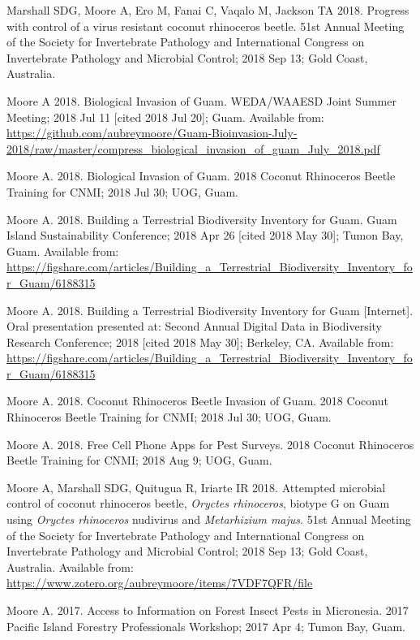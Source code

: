 \documentclass[12pt,english]{simplecv}
\begin{document}
\begin{thebibliography}{999}
\bibitem{}Marshall SDG, Moore A, Ero M, Fanai C, Vaqalo M, Jackson TA 2018. Progress with control of a virus resistant coconut rhinoceros beetle. 51st Annual Meeting of the Society for Invertebrate Pathology and International Congress on Invertebrate Pathology and Microbial Control; 2018 Sep 13; Gold Coast, Australia. 
	
\bibitem{}Moore A 2018. Biological Invasion of Guam. WEDA/WAAESD Joint Summer Meeting; 2018 Jul 11 [cited 2018 Jul 20]; Guam. Available from: \url{https://github.com/aubreymoore/Guam-Bioinvasion-July-2018/raw/master/compress\_biological\_invasion\_of\_guam\_July\_2018.pdf}
	
\bibitem{}Moore A. 2018. Biological Invasion of Guam. 2018 Coconut Rhinoceros Beetle Training for CNMI; 2018 Jul 30; UOG, Guam. 
	
\bibitem{}Moore A. 2018. Building a Terrestrial Biodiversity Inventory for Guam. Guam Island Sustainability Conference; 2018 Apr 26 [cited 2018 May 30]; Tumon Bay, Guam. Available from: \url{https://figshare.com/articles/Building\_a\_Terrestrial\_Biodiversity\_Inventory\_for\_Guam/6188315}
	
\bibitem{}Moore A. 2018. Building a Terrestrial Biodiversity Inventory for Guam [Internet]. Oral presentation presented at: Second Annual Digital Data in Biodiversity Research Conference; 2018 [cited 2018 May 30]; Berkeley, CA. Available from: \url{https://figshare.com/articles/Building\_a\_Terrestrial\_Biodiversity\_Inventory\_for\_Guam/6188315}
	
\bibitem{}Moore A. 2018. Coconut Rhinoceros Beetle Invasion of Guam. 2018 Coconut Rhinoceros Beetle Training for CNMI; 2018 Jul 30; UOG, Guam. 
	
\bibitem{}Moore A. 2018. Free Cell Phone Apps for Pest Surveys. 2018 Coconut Rhinoceros Beetle Training for CNMI; 2018 Aug 9; UOG, Guam. 
	
\bibitem{}Moore A, Marshall SDG, Quitugua R, Iriarte IR 2018. Attempted microbial control of coconut rhinoceros beetle, \textit{Oryctes rhinoceros}, biotype G on Guam using \textit{Oryctes rhinoceros} nudivirus and \textit{Metarhizium majus}. 51st Annual Meeting of the Society for Invertebrate Pathology and International Congress on Invertebrate Pathology and Microbial Control; 2018 Sep 13; Gold Coast, Australia. Available from: \url{https://www.zotero.org/aubreymoore/items/7VDF7QFR/file}


\bibitem{}Moore A. 2017. Access to Information on Forest Insect Pests in Micronesia. 2017 Pacific Island Forestry Professionals Workshop; 2017 Apr 4; Tumon Bay, Guam. 
 

\end{thebibliography}
\end{document}
